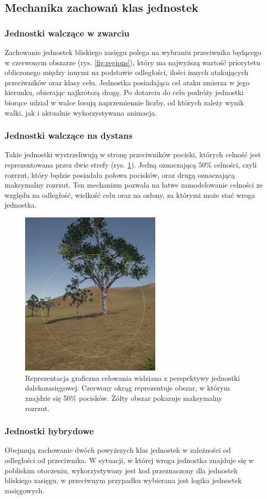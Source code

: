 \subsection{Mechanika zachowań klas jednostek}
\subsubsection{Jednostki walczące w zwarciu}
Zachowanie jednostek bliskiego zasięgu polega na wybraniu przeciwnika będącego w czerwonym obszarze (rys. \ref{fig:regions}), który ma najwyższą
wartość priorytetu obliczonego między innymi na podstawie odległości, ilości innych atakujących przeciwników oraz klasy celu.
Jednostka posiadająca cel ataku zmierza w jego kierunku, obierając najkrótszą drogę. Po dotarciu do celu podróży jednostki biorące udział w walce
losują naprzemiennie liczby, od których zależy wynik walki, jak i aktualnie wykorzystywana animacja.

\subsubsection{Jednostki walczące na dystans}
Takie jednostki wystrzeliwują w stronę przeciwników pociski, których celność jest reprezentowana przez dwie strefy (rys. \ref{fig:acc2}). Jedną oznaczającą 50\% celności,
czyli rozrzut, który będzie posiadała połowa pocisków, oraz drugą oznaczającą maksymalny rozrzut. Ten mechanizm pozwala na łatwe zamodelowanie
celności ze względu na odległość, wielkość celu oraz na osłony, za którymi może stać wroga jednostka.
\begin{figure}[h]
\centering
\includegraphics[width=0.6\textwidth]{images/acc}
\caption{Reprezentacja graficzna celowania widziana z perspektywy jednostki dalekozasięgowej. Czerwony okrąg reprezentuje obszar, w którym znajdzie się 50\% pocisków. Żółty obszar pokazuje maksymalny rozrzut.}
\label{fig:acc2}
\end{figure}
\subsubsection{Jednostki hybrydowe}
Obejmują zachowanie dwóch powyższych klas jednostek w zależności od odległości od przeciwnika.
W sytuacji, w której wroga jednostka znajduje się w pobliskim otoczeniu, wykorzystywany jest kod przeznaczony dla jednostek bliskiego zasięgu,
w przeciwnym przypadku wybierana jest logika jednostek zasięgowych.
